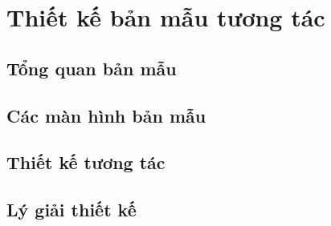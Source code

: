 \section{Thiết kế bản mẫu tương tác}

\subsection{Tổng quan bản mẫu}

\subsection{Các màn hình bản mẫu}

\subsection{Thiết kế tương tác}

\subsection{Lý giải thiết kế}

